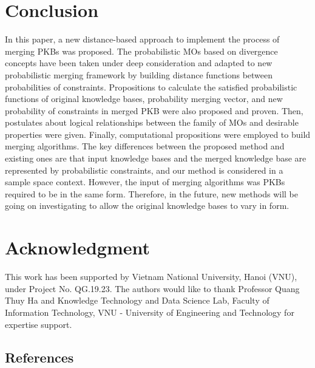 \documentclass[10pt,a4paper]{IOS-Book-Article}
\begin{document}
\section{Conclusion}

In this paper, a new distance-based approach to implement the process of merging PKBs was proposed. The probabilistic MOs based on divergence concepts have been taken under deep consideration and adapted to new probabilistic merging framework by building distance functions between probabilities of constraints. Propositions to calculate the satisfied probabilistic functions of original knowledge bases, probability merging vector, and new probability of constraints in merged PKB were also proposed and proven. Then, postulates about logical relationships between the family of MOs and desirable properties were given. Finally, computational propositions were employed to build merging algorithms. The key differences between the proposed method and existing ones are that input knowledge bases and the merged knowledge base are represented by probabilistic constraints, and our method is considered in a sample space context. However, the input of merging algorithms was PKBs required to be in the same form. Therefore, in the future, new methods will be going on investigating to allow the original knowledge bases to vary in form. 

\section{Acknowledgment}

This work has been supported by Vietnam National University, Hanoi (VNU), under Project No. QG.19.23. The authors would like to thank Professor Quang Thuy Ha and Knowledge Technology and Data Science Lab, Faculty of Information Technology, VNU - University of Engineering and Technology for expertise support.

\subsection{References}


\end{document}
